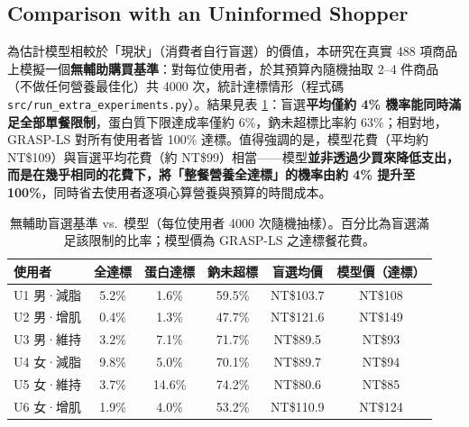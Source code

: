 \documentclass[a4paper]{article}
\begin{document}
\subsection{Comparison with an Uninformed Shopper}\label{sec:human}
為估計模型相較於「現狀」（消費者自行盲選）的價值，本研究在真實 488 項商品上模擬一個\textbf{無輔助購買基準}：對每位使用者，於其預算內隨機抽取 2--4 件商品（不做任何營養最佳化）共 4000 次，統計達標情形（程式碼 \texttt{src/run\_extra\_experiments.py}）。結果見表 \ref{tab:human}：盲選\textbf{平均僅約 4\% 機率能同時滿足全部單餐限制}，蛋白質下限達成率僅約 6\%，鈉未超標比率約 63\%；相對地，GRASP-LS 對所有使用者皆 100\% 達標。值得強調的是，模型花費（平均約 NT\$109）與盲選平均花費（約 NT\$99）相當——模型\textbf{並非透過少買來降低支出，而是在幾乎相同的花費下，將「整餐營養全達標」的機率由約 4\% 提升至 100\%}，同時省去使用者逐項心算營養與預算的時間成本。
\begin{table}[h]
\centering\small
\caption{無輔助盲選基準 vs.\ 模型（每位使用者 4000 次隨機抽樣）。百分比為盲選滿足該限制的比率；模型價為 GRASP-LS 之達標餐花費。}
\label{tab:human}
\begin{tabular}{lccccc}
\toprule
使用者 & 全達標 & 蛋白達標 & 鈉未超標 & 盲選均價 & 模型價（達標） \\
\midrule
U1 男·減脂 & 5.2\% & 1.6\%  & 59.5\% & NT\$103.7 & NT\$108 \\
U2 男·增肌 & 0.4\% & 1.3\%  & 47.7\% & NT\$121.6 & NT\$149 \\
U3 男·維持 & 3.2\% & 7.1\%  & 71.7\% & NT\$89.5  & NT\$93  \\
U4 女·減脂 & 9.8\% & 5.0\%  & 70.1\% & NT\$89.7  & NT\$94  \\
U5 女·維持 & 3.7\% & 14.6\% & 74.2\% & NT\$80.6  & NT\$85  \\
U6 女·增肌 & 1.9\% & 4.0\%  & 53.2\% & NT\$110.9 & NT\$124 \\
\bottomrule
\end{tabular}
\end{table}
\end{document}
